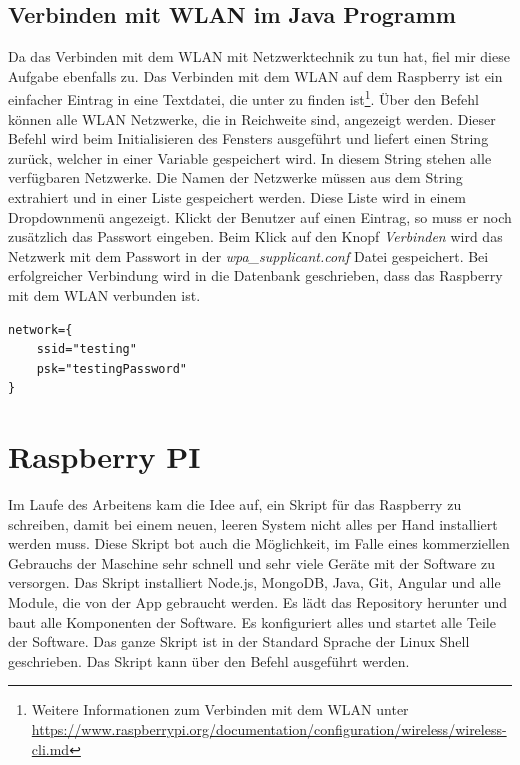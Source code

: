 \subsection{Verbinden mit WLAN im Java Programm}
\label{sec:ums-wlan}
Da das Verbinden mit dem \ac{WLAN} mit Netzwerktechnik zu tun hat, fiel mir diese Aufgabe ebenfalls zu. Das Verbinden mit dem \ac{WLAN} auf dem Raspberry ist ein einfacher Eintrag in eine Textdatei, die unter  zu finden ist\footnote{Weitere Informationen zum Verbinden mit dem WLAN unter \url{https://www.raspberrypi.org/documentation/configuration/wireless/wireless-cli.md}}. Über den Befehl  können alle \ac{WLAN} Netzwerke, die in Reichweite sind, angezeigt werden. Dieser Befehl wird beim Initialisieren des Fensters ausgeführt und liefert einen String zurück, welcher in einer Variable gespeichert wird. In diesem String stehen alle verfügbaren Netzwerke. Die Namen der Netzwerke müssen aus dem String extrahiert und in einer Liste gespeichert werden. Diese Liste wird in einem Dropdownmenü angezeigt. Klickt der Benutzer auf einen Eintrag, so muss er noch zusätzlich das Passwort eingeben. Beim Klick auf den Knopf \textit{Verbinden} wird das Netzwerk mit dem Passwort in der \textit{wpa\_supplicant.conf} Datei gespeichert. Bei erfolgreicher Verbindung wird in die Datenbank geschrieben, dass das Raspberry mit dem \ac{WLAN} verbunden ist.

\begin{lstlisting}[caption=WLAN Konfigurationsbeispiel,label=wlan-datei-beispiel,style=bash]
network={
    ssid="testing"
    psk="testingPassword"
}
\end{lstlisting}

\section{Raspberry PI}
\label{sec:raspi}
Im Laufe des Arbeitens kam die Idee auf, ein Skript für das Raspberry zu schreiben, damit bei einem neuen, leeren System nicht alles per Hand installiert werden muss. Diese Skript bot auch die Möglichkeit, im Falle eines kommerziellen Gebrauchs der Maschine sehr schnell und sehr viele Geräte mit der Software zu versorgen. Das Skript installiert Node.js, MongoDB, Java, Git, Angular und alle Module, die von der App gebraucht werden. Es lädt das Repository herunter und baut alle Komponenten der Software. Es konfiguriert alles und startet alle Teile der Software. Das ganze Skript ist in der Standard Sprache der Linux Shell geschrieben. Das Skript kann über den Befehl  ausgeführt werden.

